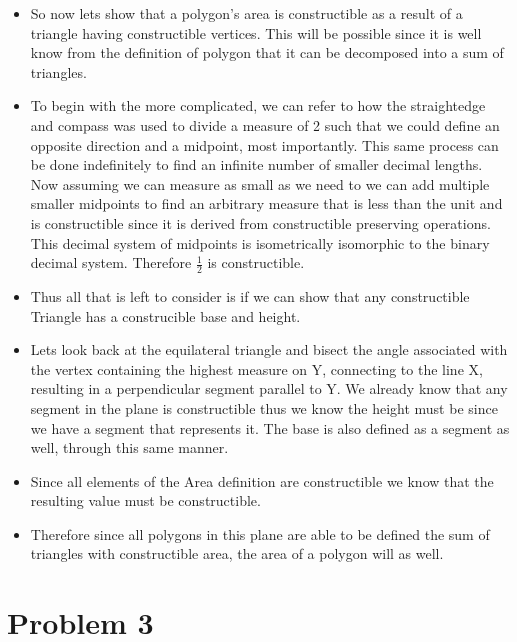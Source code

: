 \documentclass[]{report}
\begin{document}
\begin{itemize}
	\item So now lets show that a polygon's area is constructible as a result of a triangle having constructible vertices.  This will be possible since it is well know from the definition of polygon that it can be decomposed into a sum of triangles.
	
	\item To begin with the more complicated, we can refer to how the straightedge and compass was used to divide a measure of 2 such that we could define an opposite direction and a midpoint, most importantly.  This same process can be done indefinitely to find an infinite number of smaller decimal lengths.  Now assuming we can measure as small as we need to we can add multiple smaller midpoints to find an arbitrary measure that is less than the unit and is constructible since it is derived from constructible preserving operations.  This decimal system of midpoints is isometrically isomorphic to the binary decimal system.  Therefore $\frac{1}{2}$ is constructible.
	
	\item Thus all that is left to consider is if we can show that any constructible Triangle has a construcible base and height.
	
	\item Lets look back at the equilateral triangle and bisect the angle associated with the vertex containing the highest measure on Y, connecting to the line X, resulting in a perpendicular segment parallel to Y.  We already know that any segment in the plane is constructible thus we know the height must be since we have a segment that represents it.  The base is also defined as a segment as well, through this same manner.  
	
	\item Since all elements of the Area definition are constructible we know that the resulting value must be constructible.
	
	\item Therefore since all  polygons in this plane are able to be defined the sum of triangles with constructible area, the area of a polygon will as well.
	
		\begin{flushright}
		\smiley{}
	\end{flushright}
\end{itemize}
	
	
\section{Problem 3}
\end{document}
